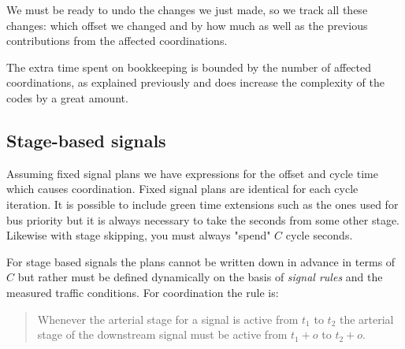 We must be ready to undo the changes we just made, so we track all these changes: which offset we changed and by how much as well as the previous contributions from the affected coordinations.

The extra time spent on bookkeeping is bounded by the number of affected coordinations, as explained previously and does increase the complexity of the codes by a great amount.

\subsection{Stage-based signals}
Assuming fixed signal plans we have expressions for the offset and cycle time which causes coordination. Fixed signal plans are identical for each cycle iteration. It is possible to include green time extensions such as the ones used for bus priority but it is always necessary to take the seconds from some other stage. Likewise with stage skipping, you must always "spend" $C$ cycle seconds.

For stage based signals the plans cannot be written down in advance in terms of $C$ but rather must be defined dynamically on the basis of \textit{signal rules} and the measured traffic conditions. For coordination the rule is:

\begin{quote}
Whenever the arterial stage for a signal is active from $t_1$ to $t_2$ the arterial stage of the downstream signal must be active from $t_1 + o$ to $t_2 + o$.
\end{quote}

